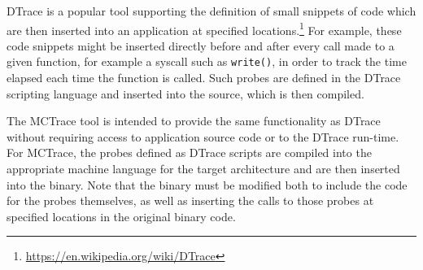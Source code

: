 DTrace is a popular tool supporting the definition of small snippets
of code which are then inserted into an application at specified
locations.\footnote{\url{https://en.wikipedia.org/wiki/DTrace}} For
example, these code snippets might be inserted directly before and
after every call made to a given function, for example a syscall such
as \texttt{write()}, in order to track the time elapsed each time the
function is called. Such probes are defined in the DTrace scripting
language and inserted into the source, which is then compiled.

The MCTrace tool is intended to provide the same functionality as DTrace
without requiring access to application source code or to the DTrace
run-time. For MCTrace, the probes defined as DTrace scripts are compiled
into the appropriate machine language for the target architecture and
are then inserted into the binary. Note that the binary must be modified
both to include the code for the probes themselves, as well as inserting
the calls to those probes at specified locations in the original binary
code.

\vspace{0.25in}



